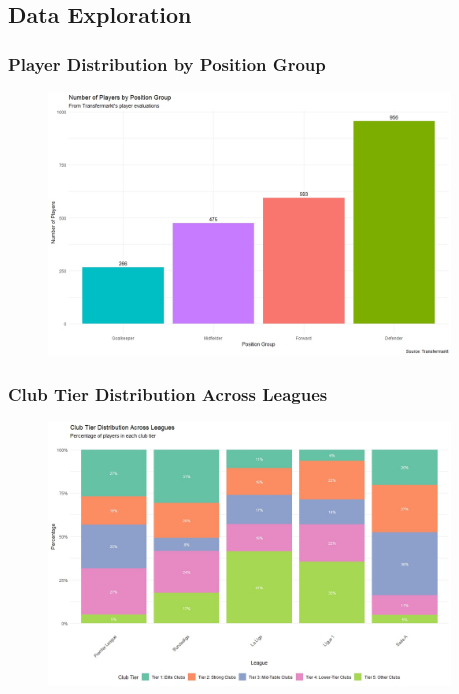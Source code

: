 \documentclass[t,aspectratio=169,xcolor=dvipsnames]{beamer}
\begin{document}
\subsection{Data Exploration}

\begin{frame}
    \frametitle{Player Distribution by Position Group}
    \begin{figure}
        \centering
        \includegraphics[width=0.95\textwidth, height=0.85\textheight, keepaspectratio]{pictures/Amount_Position_Groups.jpeg}
    \end{figure}
\end{frame}

\begin{frame}
    \frametitle{Club Tier Distribution Across Leagues}
    \begin{figure}
        \centering
        \includegraphics[width=0.95\textwidth, height=0.85\textheight, keepaspectratio]{pictures/Club_Distribution.jpeg}
    \end{figure}
\end{frame}
\end{document}
